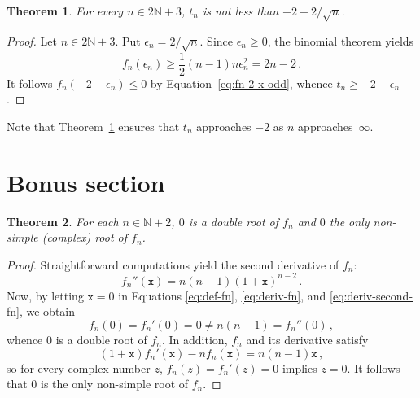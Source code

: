 \documentclass[12pt]{article}
\newcommand{\bR}{\mathbb{R}}
\newcommand{\bN}{\mathbb{N}}
\newcommand{\ttx}{\mathtt{x}}
\newtheorem{theorem}{Theorem}
\begin{document}
\begin{theorem} \label{thm:lower-sqrt}
  For every $n \in 2 \bN + 3$, $t_n$ is not less than $- 2 - 2 / \sqrt{n}$.
\end{theorem}

\begin{proof}
  Let $n \in 2 \bN + 3$.
 Put $\epsilon_n = 2 / \sqrt{n}$.
  Since $\epsilon_n \ge 0$,
  the binomial theorem yields
  $$
  f_n(\epsilon_n ) \ge \frac{1}{2} (n - 1) n \epsilon_n^2 = 2 n - 2 \,.
  $$
  It follows $f_n(- 2 - \epsilon_n) \le 0$ by Equation~\eqref{eq:fn-2-x-odd}, whence $t_n \ge - 2 - \epsilon_n$.
\end{proof} 

Note that Theorem~\ref{thm:lower-sqrt} ensures that $t_n$ approaches $- 2$ as $n$ approaches~$\infty$.


 
 

 \section{Bonus section}
 
\begin{theorem} \label{thm:root-mult}
  For each $n \in \bN + 2$,
  $0$ is a double root of $f_n$ and $0$ the only non-simple (complex) root of $f_n$.
\end{theorem}

\begin{proof}
  Straightforward computations yield the second derivative of $f_n$:
\begin{equation} \label{eq:deriv-second-fn}
f_n''(\ttx)  = n (n - 1) {(1 + \ttx)}^{n - 2} \, .
\end{equation}
  Now, by letting $\ttx = 0$ in Equations \eqref{eq:def-fn}, \eqref{eq:deriv-fn}, and \eqref{eq:deriv-second-fn},
  we obtain 
  $$
  f_n(0) = f_n'(0) = 0 \ne n (n - 1) = f_n''(0) \, ,
  $$
  whence $0$ is a double root of $f_n$.
  In addition, $f_n$ and its derivative satisfy 
   $$
   (1 + \ttx) f_n'(\ttx) - n f_n(\ttx) = n (n - 1) \ttx \, ,
   $$
   so for every complex number $z$, $f_n(z) = f_n'(z) = 0$ implies $z = 0$.
   It follows that $0$ is the only non-simple root of $f_n$.
 \end{proof}
 
\end{document}
